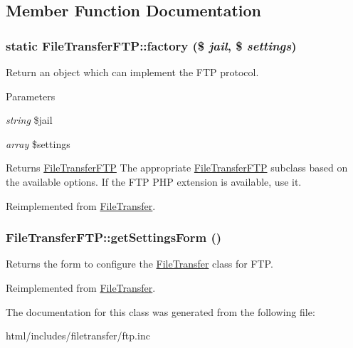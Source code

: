 \subsection{Member Function Documentation}
\hypertarget{classFileTransferFTP_a9357dd94f01df328dc19645decdf0485}{
\subsubsection[{factory}]{\setlength{\rightskip}{0pt plus 5cm}static FileTransferFTP::factory (\$ {\em jail}, \/  \$ {\em settings})}}
\label{classFileTransferFTP_a9357dd94f01df328dc19645decdf0485}
Return an object which can implement the FTP protocol.


\begin{DoxyParams}{Parameters}
\item[{\em string}]\$jail \item[{\em array}]\$settings \end{DoxyParams}
\begin{DoxyReturn}{Returns}
\hyperlink{classFileTransferFTP}{FileTransferFTP} The appropriate \hyperlink{classFileTransferFTP}{FileTransferFTP} subclass based on the available options. If the FTP PHP extension is available, use it. 
\end{DoxyReturn}


Reimplemented from \hyperlink{classFileTransfer_aed740d2f6e0780134b2b29a174ad05f2}{FileTransfer}.\hypertarget{classFileTransferFTP_a01948a51036c8bf682bc084f2457986b}{
\subsubsection[{getSettingsForm}]{\setlength{\rightskip}{0pt plus 5cm}FileTransferFTP::getSettingsForm ()}}
\label{classFileTransferFTP_a01948a51036c8bf682bc084f2457986b}
Returns the form to configure the \hyperlink{classFileTransfer}{FileTransfer} class for FTP. 

Reimplemented from \hyperlink{classFileTransfer_a3b5e843b16814bdbe43dfecda17bae33}{FileTransfer}.

The documentation for this class was generated from the following file:\begin{DoxyCompactItemize}
\item 
html/includes/filetransfer/ftp.inc\end{DoxyCompactItemize}
